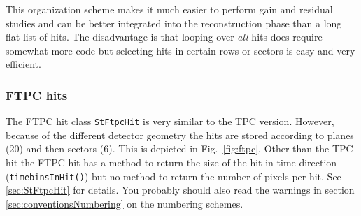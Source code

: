 \documentclass[twoside]{article}
\begin{document}
This organization scheme makes it much easier to perform gain and
residual studies and can be better integrated into the reconstruction
phase than a long flat list of hits. The disadvantage is that looping
over \emph{all} hits does require somewhat more code but selecting
hits in certain rows or sectors is easy and very efficient.

\subsubsection{FTPC hits}

The FTPC hit class \texttt{StFtpcHit} is very similar to the TPC
version.  However, because of the different detector geometry the hits
are stored according to planes (20) and then sectors (6). This is
depicted in Fig.~\ref{fig:ftpc}. Other than the TPC hit the FTPC hit
has a method to return the size of the hit in time direction
(\texttt{timebinsInHit()}) but no method to return the number of
pixels per hit. See \ref{sec:StFtpcHit} for details.  You probably
should also read the warnings in section
\ref{sec:conventionsNumbering} on the numbering schemes.
\end{document}
